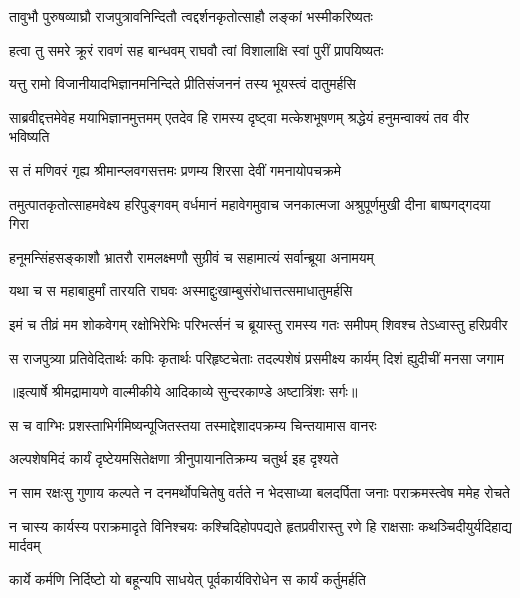 \twolineshloka
{तावुभौ पुरुषव्याघ्रौ राजपुत्रावनिन्दितौ}
{त्वद्दर्शनकृतोत्साहौ लङ्कां भस्मीकरिष्यतः} %

\twolineshloka
{हत्वा तु समरे क्रूरं रावणं सह बान्धवम्}
{राघवौ त्वां विशालाक्षि स्वां पुरीं प्रापयिष्यतः} %

\twolineshloka
{यत्तु रामो विजानीयादभिज्ञानमनिन्दिते}
{प्रीतिसंजननं तस्य भूयस्त्वं दातुमर्हसि} %

\threelineshloka
{साब्रवीद्दत्तमेवेह मयाभिज्ञानमुत्तमम्}
{एतदेव हि रामस्य दृष्ट्वा मत्केशभूषणम्}
{श्रद्धेयं हनुमन्वाक्यं तव वीर भविष्यति} %

\twolineshloka
{स तं मणिवरं गृह्य श्रीमान्प्लवगसत्तमः}
{प्रणम्य शिरसा देवीं गमनायोपचक्रमे} %

\threelineshloka
{तमुत्पातकृतोत्साहमवेक्ष्य हरिपुङ्गवम्}
{वर्धमानं महावेगमुवाच जनकात्मजा}
{अश्रुपूर्णमुखी दीना बाष्पगद्गदया गिरा} %

\twolineshloka
{हनूमन्सिंहसङ्काशौ भ्रातरौ रामलक्ष्मणौ}
{सुग्रीवं च सहामात्यं सर्वान्ब्रूया अनामयम्} %

\twolineshloka
{यथा च स महाबाहुर्मां तारयति राघवः}
{अस्माद्दुःखाम्बुसंरोधात्तत्समाधातुमर्हसि} %

\fourlineindentedshloka
{इमं च तीव्रं मम शोकवेगम्}
{रक्षोभिरेभिः परिभर्त्सनं च}
{ब्रूयास्तु रामस्य गतः समीपम्}
{शिवश्च तेऽध्वास्तु हरिप्रवीर} %

\fourlineindentedshloka
{स राजपुत्र्या प्रतिवेदितार्थः}
{कपिः कृतार्थः परिहृष्टचेताः}
{तदल्पशेषं प्रसमीक्ष्य कार्यम्}
{दिशं ह्युदीचीं मनसा जगाम} %


{॥इत्यार्षे श्रीमद्रामायणे वाल्मीकीये आदिकाव्ये सुन्दरकाण्डे अष्टात्रिंशः सर्गः॥}


\twolineshloka
{स च वाग्भिः प्रशस्ताभिर्गमिष्यन्पूजितस्तया}
{तस्माद्देशादपक्रम्य चिन्तयामास वानरः} %

\twolineshloka
{अल्पशेषमिदं कार्यं दृष्टेयमसितेक्षणा}
{त्रीनुपायानतिक्रम्य चतुर्थ इह दृश्यते} %

\fourlineindentedshloka
{न साम रक्षःसु गुणाय कल्पते}
{न दनमर्थोपचितेषु वर्तते}
{न भेदसाध्या बलदर्पिता जनाः}
{पराक्रमस्त्वेष ममेह रोचते} %

\fourlineindentedshloka
{न चास्य कार्यस्य पराक्रमादृते}
{विनिश्चयः कश्चिदिहोपपद्यते}
{हृतप्रवीरास्तु रणे हि राक्षसाः}
{कथञ्चिदीयुर्यदिहाद्य मार्दवम्} %

\twolineshloka
{कार्ये कर्मणि निर्दिष्टो यो बहून्यपि साधयेत्}
{पूर्वकार्यविरोधेन स कार्यं कर्तुमर्हति} %

